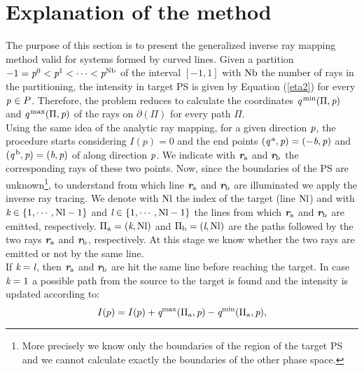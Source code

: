 \section{Explanation of the method}
The purpose of this section is to present the generalized inverse ray mapping method valid for systems formed by curved lines. 
Given a partition $-1 = \textit{p}^0<\textit{p}^1<\cdots<\textit{p}^{\textrm{Nb}}$ of the interval $[-1,1]$ with $\textrm{Nb}$ the number of rays in the partitioning, the intensity in target PS is given by Equation (\ref{eta2}) for every $\textit{p}_{\textrm{} \textit{}}\in P$.
Therefore, the problem reduces to calculate the coordinates 
$\textit{q}^{\textrm{\,min}}(\Pi, \textit{p})$ and $\textit{q}^{\textrm{\,max}}(\Pi, \textit{p})$ of the rays on $\partial$$(\Pi)$ for every path $\Pi$.\\ \indent 
Using the same idea of the analytic ray mapping, for a given direction $\textit{p}$, the procedure starts considering $I(p)=0$ and the end points $(\textit{q}^{\,\textrm{a}}, \textit{p})= (-\textit{b}, \textit{p})$ and $(\textit{q}^{\,\textrm{b}}, \textit{p}) = (\textit{b}, \textit{p})$ of  along direction $\textit{p}$. We indicate with $\textit{\textbf{r}}_{\textrm{a}}$ and $\textit{\textbf{r}}_{\textrm{b}}$ the corresponding rays of these two points. Now, since the boundaries of the PS are unknown\footnote{More precisely we know only the boundaries of the region of the target PS and we cannot calculate exactly the boundaries of the other phase space.}, to understand from which line $\textit{\textbf{r}}_{\textrm{a}}$ and $\textit{\textbf{r}}_{\textrm{b}}$ are illuminated we apply the inverse ray tracing. We denote with $\textrm{Nl}$ the index of the target (line $\textrm{Nl}$) and with $\textit{k}\in\{1,\cdots, \textrm{Nl}-1\}$ and $\textit{l}\in\{1,\cdots, \textrm{Nl}-1\}$ the lines from which $\textit{\textbf{r}}_{\textrm{a}}$ and $\textit{\textbf{r}}_{\textrm{b}}$ are emitted, respectively. $\Pi_\textrm{a} = (\textit{k}, \textrm{Nl})$ and $\Pi_\textrm{b} = (\textit{l},\textrm{Nl})$ are the paths followed by the two rays $\textit{\textbf{r}}_{\textrm{a}}$ and $\textit{\textbf{r}}_{\textrm{b}}$, respectively. At this stage we know whether the two rays are emitted or not by the same line. \\ \indent 
If $\textit{k}= \textit{l}$, then $\textit{\textbf{r}}_{\textrm{a}}$ and $\textit{\textbf{r}}_{\textrm{b}}$ are hit the same line before reaching the target. 
In case $\textit{k} = 1$ a possible path from the source to the target is found and the intensity is updated according to:
\begin{equation}
I(p) = I(p)+\textit{q}^{\textrm{max}}(\Pi_\textrm{a}, \textit{p})-\textit{q}^{\textrm{min}}(\Pi_\textrm{a}, \textit{p}),
\end{equation}
